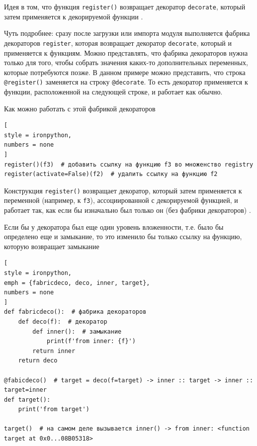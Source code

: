 \documentclass[%
	11pt,
	a4paper,
	utf8,
		]{article}
\begin{document}
Идея в том, что функция \texttt{register()} возвращает декоратор \texttt{decorate}, который затем применяется к декорируемой функции \cite{ramalho:python-2016}. 


Чуть подробнее: сразу после загрузки или импорта модуля выполняется фабрика декораторов \texttt{register}, которая возвращает декоратор \texttt{decorate}, который и применяется к функциям. Можно представлять, что фабрика декораторов нужна только для того, чтобы собрать значения каких-то дополнительных переменных, которые потребуются позже. В данном примере можно представить, что строка \texttt{@register()} заменяется на строку \texttt{@decorate}. То есть декоратор применяется к функции, расположенной на следующей строке, и работает как обычно.

Как можно работать с этой фабрикой декораторов

\begin{lstlisting}[
style = ironpython,
numbers = none
]
register()(f3)  # добавить ссылку на функцию f3 во множенство registry
register(activate=False)(f2)  # удалить ссылку на функцию f2
\end{lstlisting}

Конструкция \texttt{register()} возвращает декоратор, который затем применяется к переменной (например, к \texttt{f3}), ассоциированной с декорируемой функцией, и работает так, как если бы изначально был только он (без фабрики декораторов) \cite{ramalho:python-2016}.

Если бы у декоратора был еще один уровень вложенности, т.е. было бы определено еще и замыкание, то это изменило бы только ссылку на функцию, которую возвращает замыкание

\begin{lstlisting}[
style = ironpython,
emph = {fabricdeco, deco, inner, target},
numbers = none
]
def fabricdeco():  # фабрика декораторов
    def deco(f):  # декоратор
        def inner():  # замыкание
            print(f'from inner: {f}')
        return inner
    return deco
    
@fabicdeco()  # target = deco(f=target) -> inner :: target -> inner :: target=inner
def target():
    print('from target')
    
target()  # на самом деле вызывается inner() -> from inner: <function target at 0x0...08B05318>
\end{lstlisting}
\end{document}
